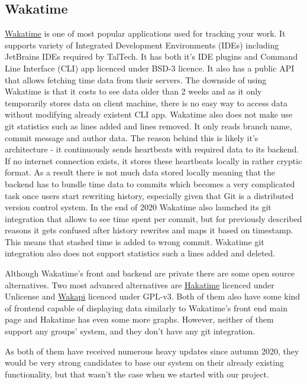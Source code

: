 \subsection{Wakatime}\label{subsec:wakatime}
\href{https://wakatime.com/about}{Wakatime} is one of most popular applications used for tracking your work.
It supports variety of Integrated Development Environments (IDEs) including JetBrains IDEs required by TalTech.
It has both it's IDE plugins and Command Line Interface (CLI) app licenced under BSD-3 licence.
It also has a public API that allows fetching time data from their servers.
The downside of using Wakatime is that it costs to see data older than 2 weeks and as it only temporarily
stores data on client machine, there is no easy way to access data without modifying already existent CLI app.
Wakatime also does not make use git statistics such as lines added and lines removed.
It only reads branch name, commit message and author data.
The reason behind this is likely it's architecture - it continuously sends heartbeats with required data to its backend.
If no internet connection exists, it stores these heartbeats locally in rather cryptic format.
As a result there is not much data stored locally meaning that the backend has to bundle time data to commits which becomes a very complicated task
once users start rewriting history, especially given that Git is a distributed version control system.
In the end of 2020 Wakatime also launched its git integration that allows to see time spent per commit, but for previously
described reasons it gets confused after history rewrites and maps it based on timestamp.
This means that stashed time is added to wrong commit.
Wakatime git integration also does not support statistics such a lines added and deleted.

Although Wakatime's front and backend are private there are some open source alternatives.
Two most advanced alternatives are \href{https://github.com/mujx/hakatime}{Hakatime} licenced under Unlicense and
\href{https://github.com/muety/wakapi}{Wakapi} licenced under GPL-v3.
Both of them also have some kind of frontend capable of displaying data similarly to Wakatime's front end main page and
Hakatime has even some more graphs.
However, neither of them support any groups' system, and they don't have any git integration.

As both of them have received numerous heavy updates since autumn 2020, they would be very strong candidates to base
our system on their already existing functionality, but that wasn't the case when we started with our project.



